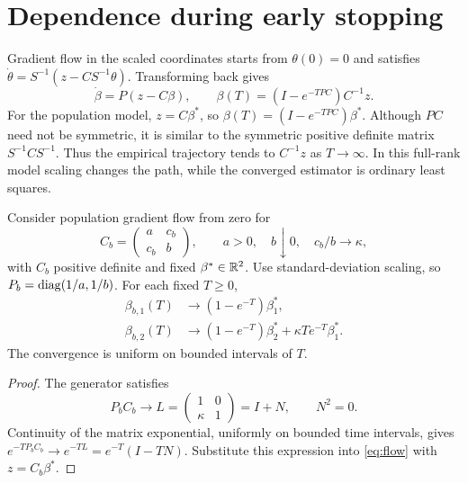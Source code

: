 \section{Dependence during early stopping}
\label{sec:flow}

Gradient flow in the scaled coordinates starts from $\theta(0) = 0$ and
satisfies $\dot\theta = S^{-1}(z - CS^{-1}\theta)$. Transforming back gives
\begin{equation}
 \label{eq:flow}
 \dot\beta = P(z - C\beta),\qquad \beta(T) = (I - e^{-TPC})C^{-1}z.
\end{equation}
For the population model, $z = C\beta^*$, so $\beta(T) = (I - e^{-TPC})\beta^*$.
Although $PC$ need not be symmetric, it is similar to the symmetric positive
definite matrix $S^{-1}CS^{-1}$. Thus the empirical trajectory tends to
$C^{-1}z$ as $T \to \infty$. In this full-rank model scaling changes the path,
while the converged estimator is ordinary least squares.

\begin{proposition}
 \label{prop:flow-limit}
 Consider population gradient flow from zero for
 \[
  C_b = \begin{pmatrix}
         a   & c_b \\
         c_b & b
        \end{pmatrix},\qquad a
      > 0,\quad b
      \downarrow 0,\quad c_b/b
      \to \kappa,
 \]
 with $C_b$ positive definite and fixed $\beta^* \in \mathbb{R}^2$. Use
 standard-deviation scaling, so $P_b = \operatorname{diag}(1/a,1/b)$. For each fixed
 $T \ge 0$,
 \begin{align*}
  \beta_{b,1}(T) & \longrightarrow (1 - e^{-T})\beta_1^*,                            \\
  \beta_{b,2}(T) & \longrightarrow (1 - e^{-T})\beta_2^* + \kappa T e^{-T}\beta_1^*.
 \end{align*}
 The convergence is uniform on bounded intervals of $T$.
\end{proposition}
\begin{proof}
 The generator satisfies
 \[
  P_bC_b \longrightarrow L
         = \begin{pmatrix}
            1      & 0 \\
            \kappa & 1
           \end{pmatrix}
         = I + N, \qquad N^2
         = 0.
 \]
 Continuity of the matrix exponential, uniformly on bounded time intervals,
 gives $e^{-TP_bC_b} \to e^{-TL} = e^{-T}(I - TN)$. Substitute this expression
 into \eqref{eq:flow} with $z = C_b\beta^*$.
\end{proof}

